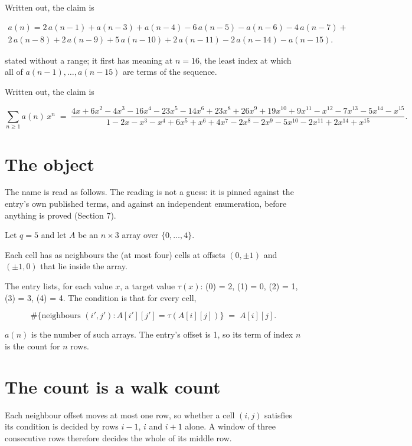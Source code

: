 \documentclass[11pt]{article}
\theoremstyle{definition}
\begin{document}
Written out, the claim is

\begin{multline*} a(n) = 2\,a(n-1) + a(n-3) + a(n-4) - 6\,a(n-5) - a(n-6) - 4\,a(n-7) + \\ 2\,a(n-8) + 2\,a(n-9) + 5\,a(n-10) + 2\,a(n-11) - 2\,a(n-14) - a(n-15). \end{multline*}

stated without a range; it first has meaning at $n = 16$, the least index at which all of $a(n-1),\dots,a(n-15)$ are terms of the sequence.

Written out, the claim is

\[\sum_{n \ge 1} a(n)\,x^n \;=\; \frac{4x + 6x^{2} - 4x^{3} - 16x^{4} - 23x^{5} - 14x^{6} + 23x^{8} + 26x^{9} + 19x^{10} + 9x^{11} - x^{12} - 7x^{13} - 5x^{14} - x^{15}}{1 - 2x - x^{3} - x^{4} + 6x^{5} + x^{6} + 4x^{7} - 2x^{8} - 2x^{9} - 5x^{10} - 2x^{11} + 2x^{14} + x^{15}}.\]

\section{The object}

The name is read as follows. The reading is not a guess: it is pinned against the entry's own published terms, and against an independent enumeration, before anything is proved (Section 7).

Let $q = 5$ and let $A$ be an $n \times 3$ array over $\{0,\dots,4\}$.

Each cell has as neighbours the (at most four) cells at offsets $(0,\pm1)$ and $(\pm1,0)$ that lie inside the array.

The entry lists, for each value $x$, a target value $\tau(x)$: \tau(0) = 2, \tau(1) = 0, \tau(2) = 1, \tau(3) = 3, \tau(4) = 4. The condition is that for every cell,

\[\#\{\text{neighbours } (i',j') : A[i'][j'] = \tau(A[i][j])\} \;=\; A[i][j].\]

$a(n)$ is the number of such arrays. The entry's offset is 1, so its term of index $n$ is the count for $n$ rows.

\section{The count is a walk count}

Each neighbour offset moves at most one row, so whether a cell $(i,j)$ satisfies its condition is decided by rows $i-1$, $i$ and $i+1$ alone. A window of three consecutive rows therefore decides the whole of its middle row.
\end{document}
